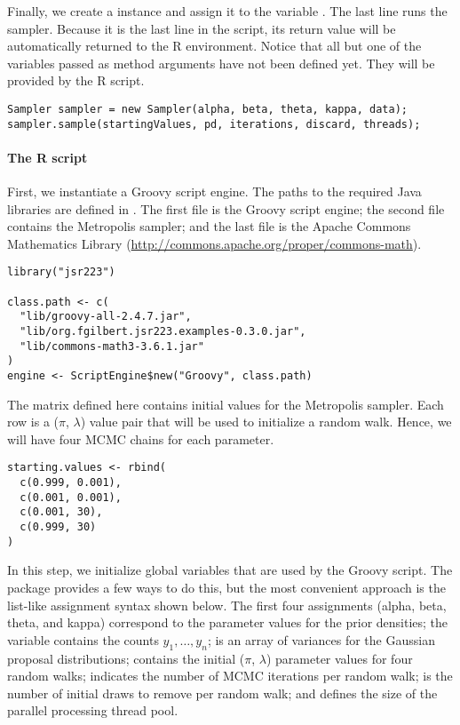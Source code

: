 Finally, we create a  instance and assign it to the variable . The last line runs the sampler. Because it is the last line in the script, its return value will be automatically returned to the R environment. Notice that all but one of the variables passed as method arguments have not been defined yet. They will be provided by the R script.
\begin{verbatim}
Sampler sampler = new Sampler(alpha, beta, theta, kappa, data);
sampler.sample(startingValues, pd, iterations, discard, threads);
\end{verbatim}

\paragraph{The R script} First, we instantiate a Groovy script engine. The paths to the required Java libraries are defined in . The first file is the Groovy script engine; the second file contains the Metropolis sampler; and the last file is the Apache Commons Mathematics Library (\url{http://commons.apache.org/proper/commons-math}).
\begin{verbatim}
library("jsr223")

class.path <- c(
  "lib/groovy-all-2.4.7.jar",
  "lib/org.fgilbert.jsr223.examples-0.3.0.jar",
  "lib/commons-math3-3.6.1.jar"
)
engine <- ScriptEngine$new("Groovy", class.path)
\end{verbatim}

The matrix  defined here contains initial values for the Metropolis sampler. Each row is a ($\pi$, $\lambda$) value pair that will be used to initialize a random walk. Hence, we will have four MCMC chains for each parameter.

\begin{verbatim}
starting.values <- rbind(
  c(0.999, 0.001),
  c(0.001, 0.001),
  c(0.001, 30),
  c(0.999, 30)
)
\end{verbatim}

In this step, we initialize global variables that are used by the Groovy script. The  package provides a few ways to do this, but the most convenient approach is the list-like assignment syntax shown below. The first four assignments (alpha, beta, theta, and kappa) correspond to the parameter values for the prior densities; the variable  contains the counts $y_1,\dots,y_n$;  is an array of variances for the Gaussian proposal distributions;  contains the initial ($\pi$, $\lambda$) parameter values for four random walks;  indicates the number of MCMC iterations per random walk;  is the number of initial draws to remove per random walk; and  defines the size of the parallel processing thread pool.

